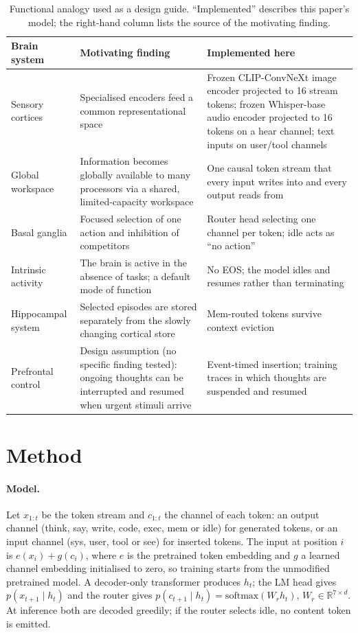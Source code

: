 \documentclass[10pt]{article}
\begin{document}
\begin{table}[t]
\centering\small
\caption{Functional analogy used as a design guide. ``Implemented'' describes this paper's model; the right-hand column lists the source of the motivating finding.}
\label{tab:brain}
\begin{tabular}{p{3.0cm}p{5.0cm}p{5.6cm}}
\toprule
Brain system & Motivating finding & Implemented here \\
\midrule
Sensory cortices & Specialised encoders feed a common representational space & Frozen CLIP-ConvNeXt image encoder \citep{liu2022convnext,radford2021clip} projected to 16 stream tokens; frozen Whisper-base audio encoder \citep{radford2023whisper} projected to 16 tokens on a hear channel; text inputs on user/tool channels \\
Global workspace & Information becomes globally available to many processors via a shared, limited-capacity workspace \citep{baars1988cognitive,dehaene1998neuronal} & One causal token stream that every input writes into and every output reads from \\
Basal ganglia & Focused selection of one action and inhibition of competitors \citep{mink1996basal,redgrave1999basal} & Router head selecting one channel per token; idle acts as ``no action'' \\
Intrinsic activity & The brain is active in the absence of tasks; a default mode of function \citep{raichle2001default} & No EOS; the model idles and resumes rather than terminating \\
Hippocampal system & Selected episodes are stored separately from the slowly changing cortical store \citep{mcclelland1995why} & Mem-routed tokens survive context eviction \\
Prefrontal control & Design assumption (no specific finding tested): ongoing thoughts can be interrupted and resumed when urgent stimuli arrive & Event-timed insertion; training traces in which thoughts are suspended and resumed \\
\bottomrule
\end{tabular}
\end{table}

\section{Method}\label{sec:method}
\paragraph{Model.} Let $x_{1:t}$ be the token stream and $c_{1:t}$ the channel of each token: an output channel (think, say, write, code, exec, mem or idle) for generated tokens, or an input channel (sys, user, tool or see) for inserted tokens. The input at position $i$ is $e(x_i)+g(c_i)$, where $e$ is the pretrained token embedding and $g$ a learned channel embedding initialised to zero, so training starts from the unmodified pretrained model. A decoder-only transformer produces $h_t$; the LM head gives $p(x_{t+1}\mid h_t)$ and the router gives $p(c_{t+1}\mid h_t)=\mathrm{softmax}(W_r h_t)$, $W_r\in\mathbb{R}^{7\times d}$. At inference both are decoded greedily; if the router selects idle, no content token is emitted.
\end{document}
